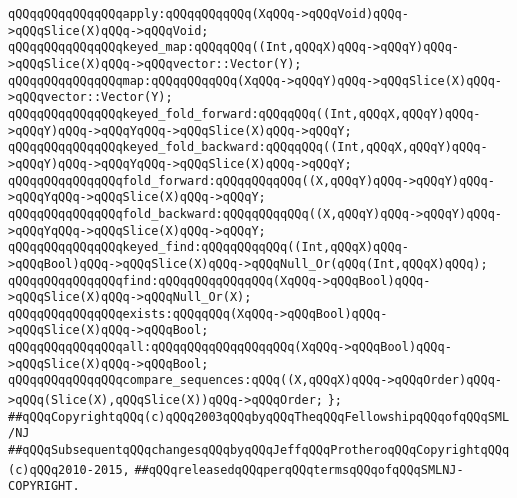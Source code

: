 \verb|qQQqqQQqqQQqqQQqapply:qQQqqQQqqQQq(XqQQq->qQQqVoid)qQQq->qQQqSlice(X)qQQq->qQQqVoid;|\newline
\newline
\verb|qQQqqQQqqQQqqQQqkeyed_map:qQQqqQQq((Int,qQQqX)qQQq->qQQqY)qQQq->qQQqSlice(X)qQQq->qQQqvector::Vector(Y);|\newline
\verb|qQQqqQQqqQQqqQQqmap:qQQqqQQqqQQq(XqQQq->qQQqY)qQQq->qQQqSlice(X)qQQq->qQQqvector::Vector(Y);|\newline
\newline
\verb|qQQqqQQqqQQqqQQqkeyed_fold_forward:qQQqqQQq((Int,qQQqX,qQQqY)qQQq->qQQqY)qQQq->qQQqYqQQq->qQQqSlice(X)qQQq->qQQqY;|\newline
\verb|qQQqqQQqqQQqqQQqkeyed_fold_backward:qQQqqQQq((Int,qQQqX,qQQqY)qQQq->qQQqY)qQQq->qQQqYqQQq->qQQqSlice(X)qQQq->qQQqY;|\newline
\newline
\verb|qQQqqQQqqQQqqQQqfold_forward:qQQqqQQqqQQq((X,qQQqY)qQQq->qQQqY)qQQq->qQQqYqQQq->qQQqSlice(X)qQQq->qQQqY;|\newline
\verb|qQQqqQQqqQQqqQQqfold_backward:qQQqqQQqqQQq((X,qQQqY)qQQq->qQQqY)qQQq->qQQqYqQQq->qQQqSlice(X)qQQq->qQQqY;|\newline
\newline
\verb|qQQqqQQqqQQqqQQqkeyed_find:qQQqqQQqqQQq((Int,qQQqX)qQQq->qQQqBool)qQQq->qQQqSlice(X)qQQq->qQQqNull_Or(qQQq(Int,qQQqX)qQQq);|\newline
\verb|qQQqqQQqqQQqqQQqfind:qQQqqQQqqQQqqQQq(XqQQq->qQQqBool)qQQq->qQQqSlice(X)qQQq->qQQqNull_Or(X);|\newline
\newline
\verb|qQQqqQQqqQQqqQQqexists:qQQqqQQq(XqQQq->qQQqBool)qQQq->qQQqSlice(X)qQQq->qQQqBool;|\newline
\verb|qQQqqQQqqQQqqQQqall:qQQqqQQqqQQqqQQqqQQq(XqQQq->qQQqBool)qQQq->qQQqSlice(X)qQQq->qQQqBool;|\newline
\newline
\verb|qQQqqQQqqQQqqQQqcompare_sequences:qQQq((X,qQQqX)qQQq->qQQqOrder)qQQq->qQQq(Slice(X),qQQqSlice(X))qQQq->qQQqOrder;|\newline
\verb|};|\newline
\newline
\newline
\verb|##qQQqCopyrightqQQq(c)qQQq2003qQQqbyqQQqTheqQQqFellowshipqQQqofqQQqSML/NJ|\newline
\verb|##qQQqSubsequentqQQqchangesqQQqbyqQQqJeffqQQqProtheroqQQqCopyrightqQQq(c)qQQq2010-2015,|\newline
\verb|##qQQqreleasedqQQqperqQQqtermsqQQqofqQQqSMLNJ-COPYRIGHT.|\newline

